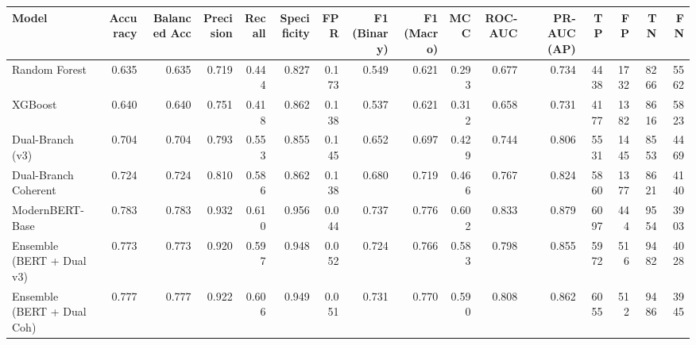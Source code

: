 \begin{tabular}{lrrrrrrrrrrrrrrr}
\toprule
Model & Accuracy & Balanced Acc & Precision & Recall & Specificity & FPR & F1 (Binary) & F1 (Macro) & MCC & ROC-AUC & PR-AUC (AP) & TP & FP & TN & FN \\
\midrule
Random Forest & 0.635 & 0.635 & 0.719 & 0.444 & 0.827 & 0.173 & 0.549 & 0.621 & 0.293 & 0.677 & 0.734 & 4438 & 1732 & 8266 & 5562 \\
XGBoost & 0.640 & 0.640 & 0.751 & 0.418 & 0.862 & 0.138 & 0.537 & 0.621 & 0.312 & 0.658 & 0.731 & 4177 & 1382 & 8616 & 5823 \\
Dual-Branch (v3) & 0.704 & 0.704 & 0.793 & 0.553 & 0.855 & 0.145 & 0.652 & 0.697 & 0.429 & 0.744 & 0.806 & 5531 & 1445 & 8553 & 4469 \\
Dual-Branch Coherent & 0.724 & 0.724 & 0.810 & 0.586 & 0.862 & 0.138 & 0.680 & 0.719 & 0.466 & 0.767 & 0.824 & 5860 & 1377 & 8621 & 4140 \\
ModernBERT-Base & 0.783 & 0.783 & 0.932 & 0.610 & 0.956 & 0.044 & 0.737 & 0.776 & 0.602 & 0.833 & 0.879 & 6097 & 444 & 9554 & 3903 \\
Ensemble (BERT + Dual v3) & 0.773 & 0.773 & 0.920 & 0.597 & 0.948 & 0.052 & 0.724 & 0.766 & 0.583 & 0.798 & 0.855 & 5972 & 516 & 9482 & 4028 \\
Ensemble (BERT + Dual Coh) & 0.777 & 0.777 & 0.922 & 0.606 & 0.949 & 0.051 & 0.731 & 0.770 & 0.590 & 0.808 & 0.862 & 6055 & 512 & 9486 & 3945 \\
\bottomrule
\end{tabular}
